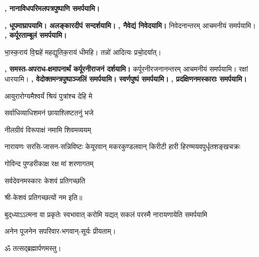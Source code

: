 \textbf{\devAya, नानाविध\-परिमल\-पत्र\-पुष्पाणि समर्पयामि।}


\textbf{\devAya{}, धूपमाघ्रापयामि। अलङ्कारदीपं सन्दर्शयामि।}
\textbf{\devAya{}, नैवेद्यं निवेदयामि।} निवेदनान्तरम् आचमनीयं समर्पयामि।
\textbf{\devAya{}, कर्पूरताम्बूलं समर्पयामि।}

भा॒स्क॒राय॑ वि॒द्महे॑ महद्युतिक॒राय॑ धीमहि।
तन्नो॑ आदित्यः प्रचो॒दया᳚त्।

\textbf{\devAya{}, समस्त-अपराध-क्षमापनार्थं कर्पूरनीराजनं दर्शयामि।} कर्पूरनीरजनानन्तरम् आचमनीयं समर्पयामि। रक्षां धारयामि।
\textbf{\devAya{}, वेदोक्तमन्त्रपुष्पाञ्जलिं समर्पयामि। स्वर्णपुष्पं समर्पयामि।}
\textbf{\devAya{}, प्रदक्षिणनमस्काराः समर्पयामि।}


\begin{center}

{आयुरारोग्यमैश्वर्यं श्रियं पुत्रांश्च देहि मे}

{सर्वाधिव्याधिशमनं छायाश्लिष्टतनुं भजे}

{नीलग्रीवं विरूपाक्षं नमामि शिवमव्ययम्}

{नारायणः सरसि-जासन-सन्निविष्टः}
{केयूरवान् मकरकुण्डलवान् किरीटी}
{हारी हिरण्मयवपुर्धृतशङ्खचक्रः}

{गोविन्द पुण्डरीकाक्ष रक्ष मां शरणागतम्}

{सर्वदेवनमस्कारः केशवं प्रतिगच्छति}

श्री-केशवं प्रतिगच्छत्यों नम इति॥


{बुद्‌ध्याऽऽत्मना वा प्रकृतेः स्वभावात्}
{करोमि यद्यत् सकलं परस्मै}
{नारायणायेति समर्पयामि}

अनेन पूजनेन सपरिवार-भगवान्-सूर्यः प्रीयताम्।\\
\end{center}

\centerline{ॐ तत्सद्ब्रह्मार्पणमस्तु।}

\begingroup
\let\chapt\sect
\begin{center}


\end{center}
\endgroup

\closesection
